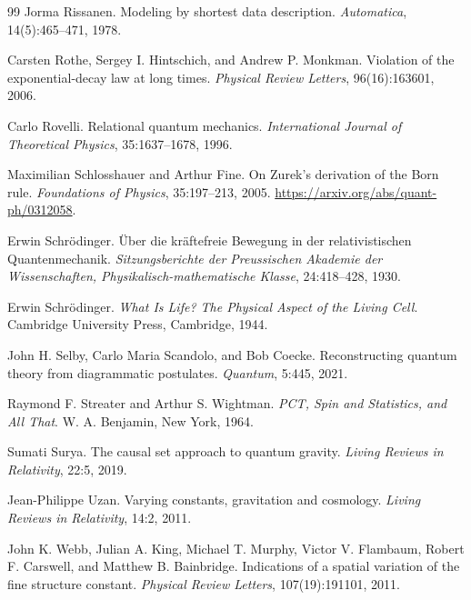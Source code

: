 \documentclass[11pt,a4paper]{article}
\theoremstyle{remark}\newtheorem{remark}[definition]{Remark}
\begin{document}
\begin{thebibliography}{99}
Jorma Rissanen.
\newblock Modeling by shortest data description.
\newblock \emph{Automatica}, 14(5):465--471, 1978.

Carsten Rothe, Sergey I. Hintschich, and Andrew P. Monkman.
\newblock Violation of the exponential-decay law at long times.
\newblock \emph{Physical Review Letters}, 96(16):163601, 2006.

Carlo Rovelli.
\newblock Relational quantum mechanics.
\newblock \emph{International Journal of Theoretical Physics}, 35:1637--1678, 1996.

Maximilian Schlosshauer and Arthur Fine.
\newblock On Zurek's derivation of the Born rule.
\newblock \emph{Foundations of Physics}, 35:197--213, 2005.
\newblock \url{https://arxiv.org/abs/quant-ph/0312058}.

Erwin Schr\"odinger.
\newblock \"Uber die kr\"aftefreie Bewegung in der relativistischen Quantenmechanik.
\newblock \emph{Sitzungsberichte der Preussischen Akademie der Wissenschaften, Physikalisch-mathematische Klasse}, 24:418--428, 1930.

Erwin Schr\"odinger.
\newblock \emph{What Is Life? The Physical Aspect of the Living Cell}.
\newblock Cambridge University Press, Cambridge, 1944.

John H. Selby, Carlo Maria Scandolo, and Bob Coecke.
\newblock Reconstructing quantum theory from diagrammatic postulates.
\newblock \emph{Quantum}, 5:445, 2021.

Raymond F. Streater and Arthur S. Wightman.
\newblock \emph{PCT, Spin and Statistics, and All That}.
\newblock W. A. Benjamin, New York, 1964.

Sumati Surya.
\newblock The causal set approach to quantum gravity.
\newblock \emph{Living Reviews in Relativity}, 22:5, 2019.

Jean-Philippe Uzan.
\newblock Varying constants, gravitation and cosmology.
\newblock \emph{Living Reviews in Relativity}, 14:2, 2011.

John K. Webb, Julian A. King, Michael T. Murphy, Victor V. Flambaum, Robert F. Carswell, and
Matthew B. Bainbridge.
\newblock Indications of a spatial variation of the fine structure constant.
\newblock \emph{Physical Review Letters}, 107(19):191101, 2011.


\end{thebibliography}
\end{document}
